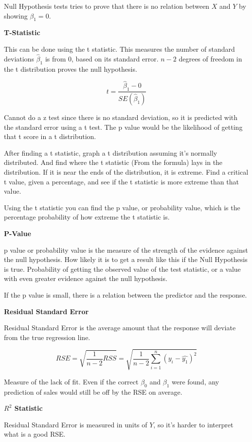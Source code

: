 \documentclass[
]{article}
\begin{document}
Null Hypothesis tests tries to prove that there is no relation between
\(X\) and \(Y\) by showing \(\beta_1 = 0\).

\textbf{T-Statistic}

This can be done using the t statistic. This measures the number of
standard deviations \(\hat\beta_1\) is from \(0\), based on its standard
error. \(n-2\) degrees of freedom in the t distribution proves the null
hypothesis.

\[t = \frac{\hat\beta_1 - 0}{SE(\hat\beta_1)}\]

Cannot do a z test since there is no standard deviation, so it is
predicted with the standard error using a t test. The p value would be
the likelihood of getting that t score in a t distribution.

After finding a t statistic, graph a t distribution assuming it's
normally distributed. And find where the t statistic (From the formula)
lays in the distribution. If it is near the ends of the distribution, it
is extreme. Find a critical t value, given a percentage, and see if the
t statistic is more extreme than that value.

Using the t statistic you can find the p value, or probability value,
which is the percentage probability of how extreme the t statistic is.

\textbf{P-Value}

p value or probability value is the measure of the strength of the
evidence against the null hypothesis. How likely it is to get a result
like this if the Null Hypothesis is true. Probability of getting the
observed value of the test statistic, or a value with even greater
evidence against the null hypothesis.

If the p value is small, there is a relation between the predictor and
the response.

\textbf{Residual Standard Error}

Residual Standard Error is the average amount that the response will
deviate from the true regression line.

\[RSE = \sqrt{\frac{1}{n-2}RSS} = \sqrt{\frac{1}{n-2}\sum^n_{i=1}(y_i-\hat{y_1})^2}\]

Measure of the lack of fit. Even if the correct \(\beta_0\) and
\(\beta_1\) were found, any prediction of sales would still be off by
the RSE on average.

\textbf{\(R^2\) Statistic}

Residual Standard Error is measured in units of \(Y\), so it's harder to
interpret what is a good RSE.
\end{document}

